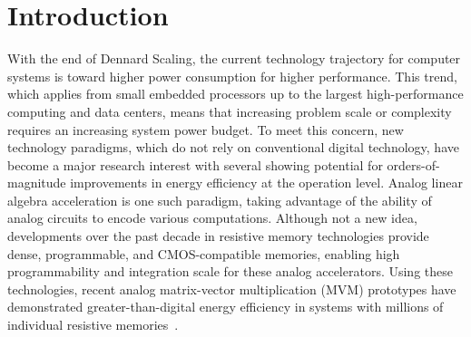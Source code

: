 \section{Introduction}


With the end of Dennard Scaling, the current technology trajectory for computer systems is toward higher power consumption for higher performance.
This trend, which applies from small embedded processors up to the largest high-performance computing and data centers, means that increasing problem scale or complexity requires an increasing system power budget.
To meet this concern, new technology paradigms, which do not rely on conventional digital technology, have become a major research interest with several showing potential for orders-of-magnitude improvements in energy efficiency at the operation level.
Analog linear algebra acceleration is one such paradigm, taking advantage of the ability of analog circuits to encode various computations. 
Although not a new idea, developments over the past decade in resistive memory technologies provide dense, programmable, and CMOS-compatible memories, enabling high programmability and integration scale for these analog accelerators.
Using these technologies, recent analog matrix-vector multiplication (MVM) prototypes have demonstrated greater-than-digital energy efficiency in systems with millions of individual resistive memories~\cite{ambrogio-energy-2023}.

